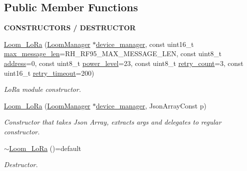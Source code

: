 \subsection*{Public Member Functions}
\begin{Indent}{\bf C\+O\+N\+S\+T\+R\+U\+C\+T\+O\+RS / D\+E\+S\+T\+R\+U\+C\+T\+OR}\par
\begin{DoxyCompactItemize}
\item 
\hyperlink{class_loom___lo_ra_a4ce2347b3ecab950594af8c26425cbc4}{Loom\+\_\+\+Lo\+Ra} (\hyperlink{class_loom_manager}{Loom\+Manager} $\ast$\hyperlink{class_loom_module_a28fe8b2fb5a9a0d14bebe13ac1c92bdf}{device\+\_\+manager}, const uint16\+\_\+t \hyperlink{class_loom_comm_plat_a2b4f69c2ec15028f5f281c3d1d399dba}{max\+\_\+message\+\_\+len}=R\+H\+\_\+\+R\+F95\+\_\+\+M\+A\+X\+\_\+\+M\+E\+S\+S\+A\+G\+E\+\_\+\+L\+EN, const uint8\+\_\+t \hyperlink{class_loom___lo_ra_a22a97e267e96a09325ab02ea0ae49f5b}{address}=0, const uint8\+\_\+t \hyperlink{class_loom___lo_ra_ab512503f36bb6be6b3134cb66e4cc84c}{power\+\_\+level}=23, const uint8\+\_\+t \hyperlink{class_loom___lo_ra_a477a700fccb38f5ac120bdfeb4ed4e4d}{retry\+\_\+count}=3, const uint16\+\_\+t \hyperlink{class_loom___lo_ra_ad3f2a482ed0ec0c7ecc3ca2e64b47ef9}{retry\+\_\+timeout}=200)
\begin{DoxyCompactList}\small\item\em Lo\+Ra module constructor. \end{DoxyCompactList}\item 
\hyperlink{class_loom___lo_ra_a6372f054737e559e2c6425f0a31765db}{Loom\+\_\+\+Lo\+Ra} (\hyperlink{class_loom_manager}{Loom\+Manager} $\ast$\hyperlink{class_loom_module_a28fe8b2fb5a9a0d14bebe13ac1c92bdf}{device\+\_\+manager}, Json\+Array\+Const p)
\begin{DoxyCompactList}\small\item\em Constructor that takes Json Array, extracts args and delegates to regular constructor. \end{DoxyCompactList}\item 
\hyperlink{class_loom___lo_ra_a97beae1307ed35c0d66d56a4c9d99c1d}{$\sim$\+Loom\+\_\+\+Lo\+Ra} ()=default
\begin{DoxyCompactList}\small\item\em Destructor. \end{DoxyCompactList}\end{DoxyCompactItemize}
\end{Indent}
